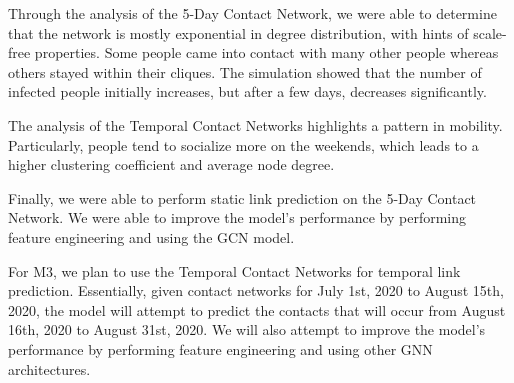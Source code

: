 \documentclass[times, 10pt,twocolumn]{article}
\begin{document}



Through the analysis of the 5-Day Contact Network, we were able to determine that the network is mostly exponential in degree distribution, with hints of scale-free properties. Some people came into contact with many other people whereas others stayed within their cliques. The simulation showed that the number of infected people initially increases, but after a few days, decreases significantly.

The analysis of the Temporal Contact Networks highlights a pattern in mobility. Particularly, people tend to socialize more on the weekends, which leads to a higher clustering coefficient and average node degree.

Finally, we were able to perform static link prediction on the 5-Day Contact Network. We were able to improve the model's performance by performing feature engineering and using the GCN model. 

For M3, we plan to use the Temporal Contact Networks for temporal link prediction. Essentially, given contact networks for July 1st, 2020 to August 15th, 2020, the model will attempt to predict the contacts that will occur from August 16th, 2020 to August 31st, 2020. We will also attempt to improve the model's performance by performing feature engineering and using other GNN architectures.
\end{document}

